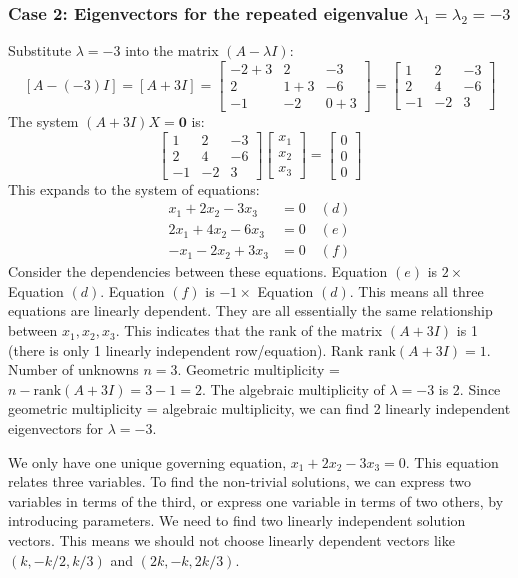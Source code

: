 \documentclass{article}
\begin{document}
\subsubsection*{Case 2: Eigenvectors for the repeated eigenvalue $\lambda_1 = \lambda_2 = -3$}
Substitute $\lambda = -3$ into the matrix $(A - \lambda I)$:
\[ [A - (-3)I] = [A + 3I] = \begin{bmatrix} -2 + 3 & 2 & -3 \\ 2 & 1 + 3 & -6 \\ -1 & -2 & 0 + 3 \end{bmatrix} = \begin{bmatrix} 1 & 2 & -3 \\ 2 & 4 & -6 \\ -1 & -2 & 3 \end{bmatrix} \]
The system $(A + 3I)X = \mathbf{0}$ is:
\[ \begin{bmatrix} 1 & 2 & -3 \\ 2 & 4 & -6 \\ -1 & -2 & 3 \end{bmatrix} \begin{bmatrix} x_1 \\ x_2 \\ x_3 \end{bmatrix} = \begin{bmatrix} 0 \\ 0 \\ 0 \end{bmatrix} \]
This expands to the system of equations:
\begin{align*} x_1 + 2x_2 - 3x_3 &= 0 \quad (d) \\ 2x_1 + 4x_2 - 6x_3 &= 0 \quad (e) \\ -x_1 - 2x_2 + 3x_3 &= 0 \quad (f) \end{align*}
Consider the dependencies between these equations. Equation $(e)$ is $2 \times$ Equation $(d)$. Equation $(f)$ is $-1 \times$ Equation $(d)$. This means all three equations are linearly dependent. They are all essentially the same relationship between $x_1, x_2, x_3$. This indicates that the rank of the matrix $(A+3I)$ is 1 (there is only 1 linearly independent row/equation).
Rank $\text{rank}(A+3I) = 1$.
Number of unknowns $n=3$.
Geometric multiplicity = $n - \text{rank}(A+3I) = 3 - 1 = 2$.
The algebraic multiplicity of $\lambda=-3$ is 2. Since geometric multiplicity = algebraic multiplicity, we can find 2 linearly independent eigenvectors for $\lambda=-3$.

We only have one unique governing equation, $x_1 + 2x_2 - 3x_3 = 0$. This equation relates three variables. To find the non-trivial solutions, we can express two variables in terms of the third, or express one variable in terms of two others, by introducing parameters. We need to find two linearly independent solution vectors. This means we should not choose linearly dependent vectors like $(k, -k/2, k/3)$ and $(2k, -k, 2k/3)$.
\end{document}
